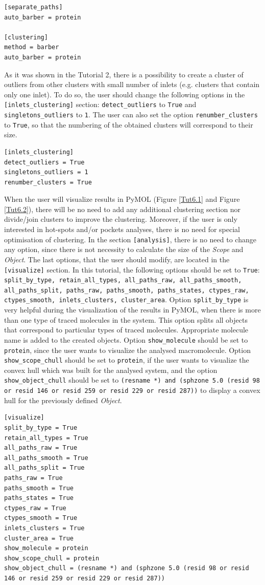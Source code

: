 \documentclass[9pt,tutorial]{livecoms}
\begin{document}
\begin{lstlisting}
[separate_paths]
auto_barber = protein

[clustering]
method = barber
auto_barber = protein
\end{lstlisting}
As it was shown in the Tutorial 2, there is a possibility to create a cluster of outliers from other clusters with small number of inlets (e.g. clusters that contain only one inlet). To do so, the user should change the following options in the \texttt{[inlets\_clustering]} section: \texttt{detect\_outliers} to \texttt{True} and \texttt{singletons\_outliers} to \texttt{1}.  The user can also set the option \texttt{renumber\_clusters} to \texttt{True}, so that the numbering of the obtained clusters will correspond to their size.
\begin{lstlisting}
[inlets_clustering]
detect_outliers = True
singletons_outliers = 1
renumber_clusters = True
\end{lstlisting}
When the user will visualize results in PyMOL (Figure \ref{Tut6.1} and Figure \ref{Tut6.2}), there will be no need to add any additional clustering section nor divide/join clusters to improve the clustering. Moreover, if the user is only interested in hot-spots and/or pockets analyses, there is no need for special optimisation of clustering. 
In the section \texttt{[analysis]}, there is no need to change any option, since there is not necessity to calculate the size of the \emph{Scope} and \emph{Object}.
The last options, that the user should modify, are located in the \texttt{[visualize]} section. In this tutorial, the following options should be set to \texttt{True}: \texttt{split\_by\_type, retain\_all\_types, all\_paths\_raw, all\_paths\_smooth, all\_paths\_split, paths\_raw, paths\_smooth, paths\_states, ctypes\_raw, ctypes\_smooth, inlets\_clusters, cluster\_area}. Option \texttt{split\_by\_type} is very helpful during the visualization of the results in PyMOL, when there is more than one type of traced molecules in the system. This option splits all objects that correspond to particular types of traced molecules. Appropriate molecule name is added to the created objects. Option \texttt{show\_molecule} should be set to \texttt{protein}, since the user wants to visualize the analysed macromolecule. Option \texttt{show\_scope\_chull} should be set to \texttt{protein}, if the user wants to visualize the convex hull which was built for the analysed system, and the option \texttt{show\_object\_chull} should be set to \texttt{(resname *) and (sphzone 5.0 (resid 98 or resid 146 or resid 259 or resid 229 or resid 287))} to display a convex hull for the previously defined \emph{Object}. 
\begin{lstlisting}
[visualize]
split_by_type = True
retain_all_types = True
all_paths_raw = True
all_paths_smooth = True
all_paths_split = True
paths_raw = True
paths_smooth = True
paths_states = True
ctypes_raw = True
ctypes_smooth = True
inlets_clusters = True
cluster_area = True
show_molecule = protein
show_scope_chull = protein
show_object_chull = (resname *) and (sphzone 5.0 (resid 98 or resid 146 or resid 259 or resid 229 or resid 287))
\end{lstlisting}
\end{document}
